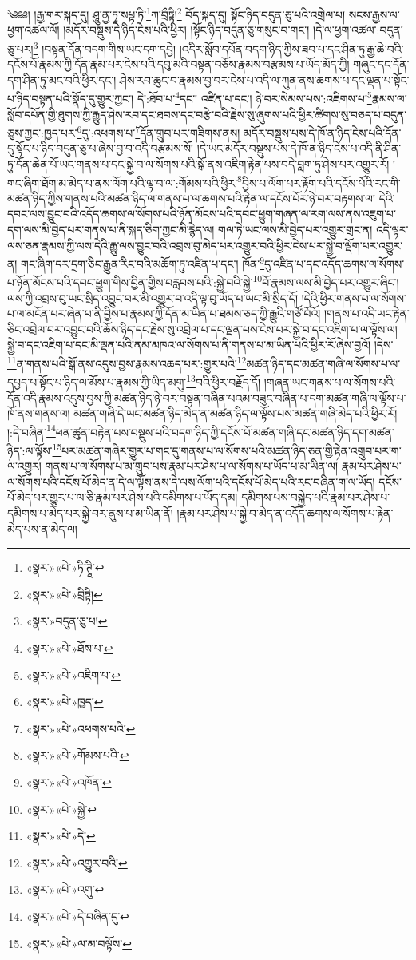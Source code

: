༄༅༅། །རྒྱ་གར་སྐད་དུ། ཤཱུ་ནྱ་ཏཱ་སཔྟ་ཏི་\footnote{«སྣར་»«པེ་»ཏི་ཊཱི་}ཀ་བྲྀཏྟི།\footnote{«སྣར་»«པེ་»བྲིཏྟི།} བོད་སྐད་དུ། སྟོང་ཉིད་བདུན་ཅུ་པའི་འགྲེལ་པ། སངས་རྒྱས་ལ་ཕྱག་འཚལ་ལོ། །མདོར་བསྡུས་དེ་ཉིད་ངེས་པའི་ཕྱིར། །སྟོང་ཉིད་བདུན་ཅུ་གསུང་བ་གང་། །དེ་ལ་ཕྱག་འཚལ་:བདུན་ཅུ་པར།\footnote{«སྣར་»བདུན་ཅུ་པ།} །བསྟན་དོན་བདག་གིས་ཡང་དག་དབྱེ། །འདིར་སློབ་དཔོན་བདག་ཉིད་ཀྱིས་ཟབ་པ་དང་ཤིན་ཏུ་རྒྱ་ཆེ་བའི་དངོས་པོ་རྣམས་ཀྱི་དོན་རྣམ་པར་ངེས་པའི་དབུ་མའི་བསྟན་བཅོས་རྣམས་བརྩམས་པ་ཡོད་མོད་ཀྱི། གཞུང་དང་དོན་དག་ཤིན་ཏུ་མང་བའི་ཕྱིར་དང་། ཤེས་རབ་ཆུང་བ་རྣམས་བྱ་བར་ངེས་པ་འདི་ལ་ཀུན་ནས་ཆགས་པ་དང་ལྡན་པ་སྟོང་པ་ཉིད་བསྟན་པའི་སྣོད་དུ་གྱུར་ཀྱང་། དེ་:ཐོབ་པ་\footnote{«སྣར་»«པེ་»ཐོས་པ་}དང་། འཛིན་པ་དང་། ཉེ་བར་སེམས་པས་:འཇིགས་པ་\footnote{«སྣར་»«པེ་»འཇིག་པ་}རྣམས་ལ་སློབ་དཔོན་གྱི་ཐུགས་ཀྱི་རྒྱུད་ཤེས་རབ་དང་ཐབས་དང་བརྩེ་བའི་རྗེས་སུ་ཞུགས་པའི་ཕྱིར་ཚིགས་སུ་བཅད་པ་བདུན་ཅུས་ཀྱང་:ཁྱད་པར་\footnote{«སྣར་»«པེ་»ཁྱད་}དུ་:འཕགས་པ་\footnote{«སྣར་»«པེ་»འཕགས་པའི་}དོན་གྲུབ་པར་གཟིགས་ནས། མདོར་བསྡུས་པས་དེ་ཁོ་ན་ཉིད་ངེས་པའི་དོན་དུ་སྟོང་པ་ཉིད་བདུན་ཅུ་པ་ཞེས་བྱ་བ་འདི་བརྩམས་སོ། །དེ་ཡང་མདོར་བསྡུས་པས་དེ་ཁོ་ན་ཉིད་ངེས་པ་འདི་ནི་ཤིན་ཏུ་དོན་ཆེན་པོ་ཡང་གནས་པ་དང་སྐྱེ་བ་ལ་སོགས་པའི་སྒོ་ནས་འཇིག་རྟེན་པས་བདེ་བླག་ཏུ་ཤེས་པར་འགྱུར་རོ། །གང་ཞིག་ཐོག་མ་མེད་པ་ནས་ལོག་པའི་ལྟ་བ་ལ་:གོམས་པའི་ཕྱིར་\footnote{«སྣར་»«པེ་»གོམས་པའི་}བྱིས་པ་ལོག་པར་རྟོག་པའི་དངོས་པོའི་རང་གི་མཚན་ཉིད་ཀྱིས་གནས་པའི་མཚན་ཉིད་ལ་གནས་པ་ལ་ཆགས་པའི་རྟེན་ལ་དངོས་པོར་ཉེ་བར་བརྟགས་ལ། དེའི་དབང་ལས་བྱུང་བའི་འདོད་ཆགས་ལ་སོགས་པའི་ཉོན་མོངས་པའི་དབང་ཕྱུག་གཞན་ལ་རག་ལས་ནས་འཇུག་པ་དག་ལས་མི་བྱེད་པར་གནས་པ་ནི་སྐད་ཅིག་ཀྱང་མི་རྙེད་ལ། གལ་ཏེ་ཡང་ལས་མི་བྱེད་པར་འགྱུར་གྲང་ན། འདི་ལྟར་ལས་ཅན་རྣམས་ཀྱི་ལས་དེའི་རྒྱུ་ལས་བྱུང་བའི་འབྲས་བུ་མེད་པར་འགྱུར་བའི་ཕྱིར་ངེས་པར་སྐྱེ་བ་ལྡོག་པར་འགྱུར་ན། གང་ཞིག་དར་དྲག་ཅིང་རྒྱུན་རིང་བའི་མཆོག་ཏུ་འཛིན་པ་དང་། ཁོན་\footnote{«སྣར་»«པེ་»འཁོན་}དུ་འཛིན་པ་དང་འདོད་ཆགས་ལ་སོགས་པ་ཉོན་མོངས་པའི་དབང་ཕྱུག་གིས་བྱིན་གྱིས་བརླབས་པའི་:སྐྱེ་བའི་སྐྱེ་\footnote{«སྣར་»«པེ་»སྐྱེ་}བོ་རྣམས་ལས་མི་བྱེད་པར་འགྱུར་ཞིང་། ལས་ཀྱི་འབྲས་བུ་ཡང་སྲིད་འབྱུང་བར་མི་འགྱུར་བ་འདི་ལྟ་བུ་ཡོད་པ་ཡང་མི་སྲིད་དོ། །དེའི་ཕྱིར་གནས་པ་ལ་སོགས་པ་ལ་མངོན་པར་ཞེན་པ་ནི་བྱིས་པ་རྣམས་ཀྱི་དོན་མ་ཡིན་པ་ཐམས་ཅད་ཀྱི་རྒྱུའི་གཙོ་བོའོ། །གནས་པ་འདི་ཡང་རྟེན་ཅིང་འབྲེལ་བར་འབྱུང་བའི་ཆོས་ཉིད་དང་རྗེས་སུ་འབྲེལ་པ་དང་ལྡན་པས་ངེས་པར་སྐྱེ་བ་དང་འཇིག་པ་ལ་ལྟོས་ལ། སྐྱེ་བ་དང་འཇིག་པ་དང་མི་ལྡན་པའི་ནམ་མཁའ་ལ་སོགས་པ་ནི་གནས་པ་མ་ཡིན་པའི་ཕྱིར་རོ་ཞེས་བྱའོ། །དེས་\footnote{«སྣར་»«པེ་»དེ་}ན་གནས་པའི་སྒོ་ནས་འདུས་བྱས་རྣམས་འཆད་པར་:གྱུར་པའི་\footnote{«སྣར་»«པེ་»འགྱུར་བའི་}མཚན་ཉིད་དང་མཚན་གཞི་ལ་སོགས་པ་ལ་དཔྱད་པ་སྟོང་པ་ཉིད་ལ་མོས་པ་རྣམས་ཀྱི་ཡིད་མགུ་\footnote{«སྣར་»«པེ་»འགུ་}བའི་ཕྱིར་བརྗོད་དོ། །གཞན་ཡང་གནས་པ་ལ་སོགས་པའི་དོན་འདི་རྣམས་འདུས་བྱས་ཀྱི་མཚན་ཉིད་ཉེ་བར་བསྟན་བཞིན་པའམ་བཟུང་བཞིན་པ་དག་མཚན་གཞི་ལ་ལྟོས་པ་ཁོ་ནས་གནས་ལ། མཚན་གཞི་དེ་ཡང་མཚན་ཉིད་མེད་ན་མཚན་ཉིད་ལ་ལྟོས་པས་མཚན་གཞི་མེད་པའི་ཕྱིར་རོ། །:དེ་བཞིན་\footnote{«སྣར་»«པེ་»དེ་བཞིན་དུ་}ཕན་ཚུན་བརྟེན་པས་བསྡུས་པའི་བདག་ཉིད་ཀྱི་དངོས་པོ་མཚན་གཞི་དང་མཚན་ཉིད་དག་མཚན་ཉིད་:ལ་ལྟོས་\footnote{«སྣར་»«པེ་»ལ་མ་བལྟོས་}པར་མཚན་གཞིར་གྱུར་པ་གང་དུ་གནས་པ་ལ་སོགས་པའི་མཚན་ཉིད་ཅན་གྱི་རྟེན་འགྲུབ་པར་ག་ལ་འགྱུར། གནས་པ་ལ་སོགས་པ་མ་གྲུབ་པས་རྣམ་པར་ཤེས་པ་ལ་སོགས་པ་ཡོད་པ་མ་ཡིན་ལ། རྣམ་པར་ཤེས་པ་ལ་སོགས་པའི་དངོས་པོ་མེད་ན་དེ་ལ་ལྟོས་ནས་དེ་ལས་ལོག་པའི་དངོས་པོ་མེད་པའི་རང་བཞིན་ག་ལ་ཡོད། དངོས་པོ་མེད་པར་གྱུར་པ་ལ་ཅི་རྣམ་པར་ཤེས་པའི་དམིགས་པ་ཡོད་དམ། དམིགས་པས་བསྐྱེད་པའི་རྣམ་པར་ཤེས་པ་དམིགས་པ་མེད་པར་སྐྱེ་བར་ནུས་པ་མ་ཡིན་ནོ། །རྣམ་པར་ཤེས་པ་སྐྱེ་བ་མེད་ན་འདོད་ཆགས་ལ་སོགས་པ་རྟེན་མེད་པས་ན་མེད་ལ། 